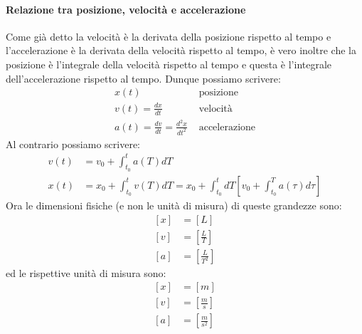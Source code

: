     \paragraph{Relazione tra posizione, velocità e accelerazione}
        Come già detto la velocità è la derivata della posizione rispetto al tempo e l'accelerazione è la derivata della velocità rispetto al tempo, è vero inoltre che la posizione è l'integrale della velocità rispetto al tempo e questa è l'integrale dell'accelerazione rispetto al tempo. Dunque possiamo scrivere:
        \begin{align}
            x(t) &\text{ posizione} \\
            v(t) = \frac{dx}{dt} &\text{ velocità} \\
            a(t) = \frac{dv}{dt} = \frac{d^2x}{dt^2} &\text{ accelerazione}
        \end{align} 
        Al contrario possiamo scrivere:
        \begin{align}
            v(t) &= v_0 + \int_{t_0}^{t} a(T) dT\\
            x(t) &= x_0 + \int_{t_0}^{t} v(T) dT = x_0 + \int_{t_0}^{t} dT \left[v_0+\int_{t_0}^{T} a(\tau) d\tau\right]
        \end{align}
        Ora le dimensioni fisiche (e non le unità di misura) di queste grandezze sono:
        $$
            \begin{aligned}
                \left[x\right] &= \left[L\right]\\
                [v] &= \left[\frac{L}{T}\right]\\
                [a] &= \left[\frac{L}{T^2}\right]
            \end{aligned}
        $$
        ed le rispettive unità di misura sono:
        $$
            \begin{aligned}
                \left[x\right] &= \left[m\right]\\
                [v] &= \left[\frac{m}{s}\right]\\
                [a] &= \left[\frac{m}{s^2}\right]
            \end{aligned}
        $$